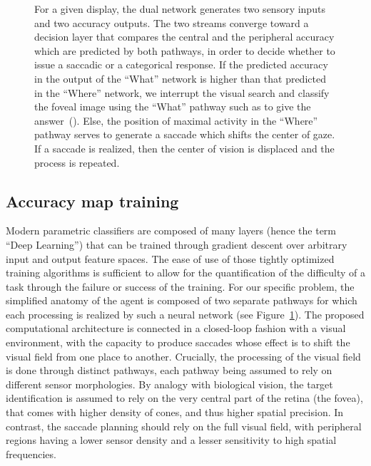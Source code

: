 \begin{figure}[t!]
{		\D
		For a given display, the dual network generates two sensory inputs and two accuracy outputs. The two streams converge toward a decision layer that compares the central and the peripheral accuracy which are predicted by both pathways, in order to decide whether to issue a saccadic or a categorical response. If the predicted accuracy in the output of the ``What'' network is higher than that predicted in the ``Where'' network,  we interrupt the visual search and classify the foveal image using the ``What'' pathway such as to give the answer~(\ANS ).  Else, the position of maximal activity in the ``Where'' pathway serves to generate a saccade which shifts the center of gaze. If a saccade is realized, then the center of vision is displaced and the process is repeated.%
		\label{fig:methods}}%
\end{figure}%


\subsection{Accuracy map training}

Modern parametric classifiers are composed of many layers (hence the term ``Deep Learning'') that can be trained through gradient descent over arbitrary input and output feature spaces. The ease of use of those tightly optimized training algorithms is sufficient to allow for the quantification of the difficulty of a task through the failure or success of the training.
For our specific problem, the simplified anatomy of the agent is composed of two separate pathways for which each processing is realized by such a neural network (see Figure~\ref{fig:methods}). The proposed computational architecture is connected in a closed-loop fashion with a visual environment, with the capacity to produce saccades whose effect is to shift the visual field from one place to another. Crucially, the processing of the visual field is done through distinct pathways, each pathway being assumed to rely on different sensor morphologies. By analogy with biological vision, the target identification is assumed to rely on the very central part of the retina (the fovea), that comes with higher density of cones, and thus higher spatial precision. In contrast, the saccade planning should rely on the full visual field, with peripheral regions having a lower sensor density and a lesser sensitivity to high spatial frequencies.

